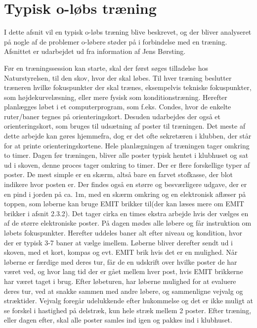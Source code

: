 \newpage
\section{Typisk o-løbs træning}
I dette afsnit vil en typisk o-løbs træning blive beskrevet, og der bliver analyseret på nogle af de problemer o-løbere støder på i forbindelse med en træning. Afsnittet er udarbejdet ud fra information af Jens Børsting.

Før en træningssession kan starte, skal der først søges tilladelse hos Naturstyrelsen, til den skov, hvor der skal løbes. \newline
Til hver træning beslutter træneren hvilke fokuspunkter der skal trænes, eksempelvis tekniske fokuspunkter, som højdekurvelæsning, eller mere fysisk som konditionstræning. Herefter planlægges løbet i et computerprogram, som f.eks. Condes, hvor de enkelte ruter/baner tegnes på orienteringskort. Desuden udarbejdes der også et orienteringskort, som bruges til udsætning af poster til træningen. Det meste af dette arbejde kan gøres hjemmefra, dog er det ofte sekretæren i klubben, der står for at printe orienteringskortene. Hele planlægningen af træningen tager omkring to timer. Dagen før træningen, bliver alle poster typisk hentet i klubhuset og sat ud i skoven, denne proces tager omkring to timer. Der er flere forskellige typer af poster. De mest simple er en skærm, altså bare en farvet stofkasse, der blot indikere hvor posten er. Der findes også en større og besværligere udgave, der er en pind i jorden på ca. 1m, med en skærm omkring og en elektronisk aflæser på toppen, som løberne kan bruge EMIT brikker til(der kan læses mere om EMIT brikker i afsnit 2.3.2). Det tager cirka en times ekstra arbejde hvis der vælges en af de større elektroniske poster.\newline
På dagen mødes alle løbere og får instruktion om løbets fokuspunkter. Herefter uddeles baner alt efter niveau og kondition, hvor der er typisk 3-7 baner at vælge imellem. Løberne bliver derefter sendt ud i skoven, med et kort, kompas og evt. EMIT brik hvis det er en mulighed. Når løberne er færdige med deres tur, får de en udskrift over hvilke poster de har været ved, og hvor lang tid der er gået mellem hver post, hvis EMIT brikkerne har været taget i brug.
Efter løbeturen, har løberne mulighed for at evaluere deres tur, ved at snakke sammen med andre løbere, og sammenligne vejvalg og stræktider. Vejvalg foregår udelukkende efter hukommelse og det er ikke muligt at se forskel i hastighed på delstræk, kun hele stræk mellem 2 poster. 
Efter træning, eller dagen efter, skal alle poster samles ind igen og pakkes ind i klubhuset.\newline

